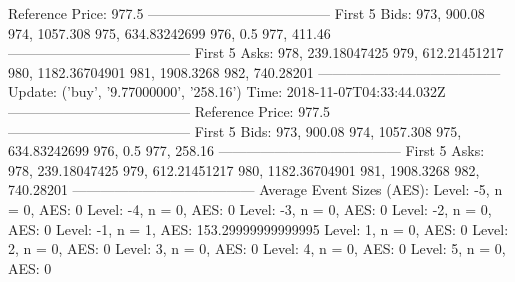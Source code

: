 Reference Price: 977.5
---------------------------------------
First 5 Bids: 
973, 900.08
974, 1057.308
975, 634.83242699
976, 0.5
977, 411.46
---------------------------------------
First 5 Asks: 
978, 239.18047425
979, 612.21451217
980, 1182.36704901
981, 1908.3268
982, 740.28201
---------------------------------------
Update: ('buy', '9.77000000', '258.16')
Time: 2018-11-07T04:33:44.032Z
---------------------------------------
Reference Price: 977.5
---------------------------------------
First 5 Bids: 
973, 900.08
974, 1057.308
975, 634.83242699
976, 0.5
977, 258.16
---------------------------------------
First 5 Asks: 
978, 239.18047425
979, 612.21451217
980, 1182.36704901
981, 1908.3268
982, 740.28201
---------------------------------------
Average Event Sizes (AES):
Level: -5, n = 0, AES: 0
Level: -4, n = 0, AES: 0
Level: -3, n = 0, AES: 0
Level: -2, n = 0, AES: 0
Level: -1, n = 1, AES: 153.29999999999995
Level: 1, n = 0, AES: 0
Level: 2, n = 0, AES: 0
Level: 3, n = 0, AES: 0
Level: 4, n = 0, AES: 0
Level: 5, n = 0, AES: 0
